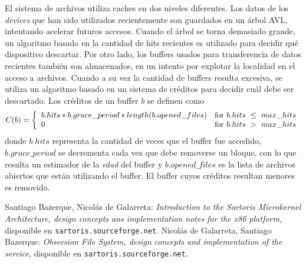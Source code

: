 \documentclass[11pt, letterpaper, twoside]{book}
\begin{document}
El sistema de archivos utiliza caches en dos niveles diferentes. Los datos de los \emph{devices} que han sido utilizados recientemente son guardados en un \'arbol AVL, intentando acelerar futuros accesos. Cuando el \'arbol se torna demasiado grande, un algoritmo basado en la cantidad de hits recientes es utilizado para decidir qu\'e dispositivo descartar. Por otro lado, los buffers usados para transferencia de datos recientes tambi\'en son almacenados, en un intento por explotar la localidad en el acceso a archivos. Cuando a su vez la cantidad de buffers resulta excesiva, se utiliza un algoritmo basado en un sistema de cr\'editos para decidir cu\'al debe ser descartado. Los cr\'editos de un buffer $b$ se definen como
\begin{displaymath}
C(b)=\left\{
\begin{array}
[c]{ll}%
b.hits\ast b.grace\_period\ast length(b.opened\_files)& \text{for }b.hits\text{ }\leq\text{ }max\_hits\\
0 & \text{for }b.hits\text{ }>\text{\ }max\_hits
\end{array}
\right.
\end{displaymath}
donde $b.hits$ representa la cantidad de veces que el buffer fue accedido, $b.grace\_period$ se decrementa cada vez que debe removerse un bloque, con lo que resulta un estimador de la \emph{edad} del buffer y $b.opened\_files$ es la lista de archivos abiertos que est\'an utilizando el buffer. El buffer cuyos cr\'editos resultan menores es removido.


\begin{thebibliography}{99}
 Santiago Bazerque, Nicol\'as de Galarreta: \emph{Introduction to the Sartoris Microkernel Architecture, design concepts ans implementation notes for the x86 platform}, disponible en \texttt{sartoris.sourceforge.net}.
 Nicol\'as de Galarreta, Santiago Bazerque: \emph{Obseesion File System, design concepts and implementation of the service}, disponible en \texttt{sartoris.sourceforge.net}.
\end{thebibliography}
\end{document}
